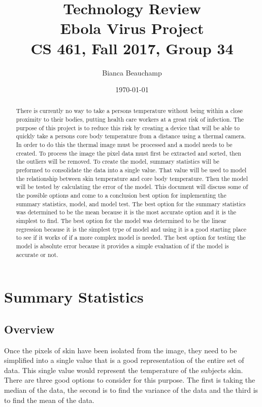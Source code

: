 \documentclass[onecolumn, draftclsnofoot,10pt, compsoc]{IEEEtran}
\title{%
	  Technology Review\\
	  \vspace{0.4cm}
	  \large Ebola Virus Project \\
	  \vspace{0.4cm}
	  \large CS 461, Fall 2017, Group 34\\
	    }
\author{Bianca Beauchamp}
\date{\today}
\begin{document}
	\maketitle
	

	\begin{abstract}
	There is currently no way to take a persons temperature without being within a close proximity to their bodies, putting health care workers at a great risk of infection. The purpose of this project is to reduce this risk by creating a device that will be able to quickly take a persons core body temperature from a distance using a thermal camera. In order to do this the thermal image must be processed and a model needs to be created. To process the image the pixel data must first be extracted and sorted, then the outliers will be removed. To create the model, summary statistics will be preformed to consolidate the data into a single value. That value will be used to model the relationship between skin temperature and core body temperature. Then the model will be tested by calculating the error of the model. This document will discuss some of the possible options and come to a conclusion best option for implementing the summary statistics, model, and model test. The best option for the summary statistics was determined to be the mean because it is the most accurate option and it is the simplest to find. The best option for the model was determined to be the linear regression because it is the simplest type of model and using it is a good starting place to see if it works of if a more complex model is needed. The best option for testing the model is absolute error because it provides a simple evaluation of if the model is accurate or not.
	
	\end{abstract}
	

	\newpage
	
	\section{Summary Statistics}
		\subsection{Overview}
		Once the pixels of skin have been isolated from the image, they need to be simplified into a single value that is a good representation of the entire set of data. This single value would represent the temperature of the subjects skin. There are three good options to consider for this purpose. The first is taking the median of the data, the second is to find the variance of the data and the third is to find the mean of the data. 
\end{document}
